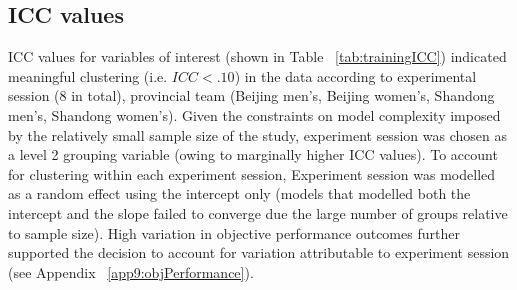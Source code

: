 \subsection{ICC values}


ICC values for variables of interest (shown in Table ~\ref{tab:trainingICC}) indicated meaningful clustering (i.e. $ICC <.10$) in the data according to experimental session (8 in total), provincial team (Beijing men's, Beijing women's, Shandong men's, Shandong women's).  Given the constraints on model complexity imposed by the relatively small sample size of the study, experiment session was chosen as a level 2 grouping variable (owing to marginally higher ICC values).  To account for clustering within each experiment session, Experiment session was modelled as a random effect using the intercept only (models that modelled both the intercept and the slope failed to converge due the large number of groups relative to sample size).  High variation in objective performance outcomes further supported the decision to account for variation attributable to experiment session (see Appendix ~\ref{app9:objPerformance}).










